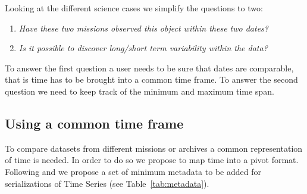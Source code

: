 \documentclass[11pt,a4paper]{ivoa}
\begin{document}
%

Looking at the different science cases we simplify the questions to two:
\begin{enumerate}
\item \emph{Have these two missions observed this object within these two dates?}
\item \emph{Is it possible to discover long/short term variability within the data?}

\end{enumerate}
To answer the first question a user needs to be sure that dates are comparable, that is time has to be brought into a common time frame. 
To answer the second question we need to keep track of the minimum and maximum time span. 

\subsection{Using a common time frame}
\label{sec:comtimeframe}
To compare datasets from different missions or archives a common representation of time is needed. In order to do so we propose to map time into a pivot format. Following \cite{2015A+A...574A..36R} and \cite{2007ivoa.spec.1030R} we propose a set of minimum metadata to be added for serializations of Time Series (see Table~\ref{tab:metadata}). 
\end{document}
